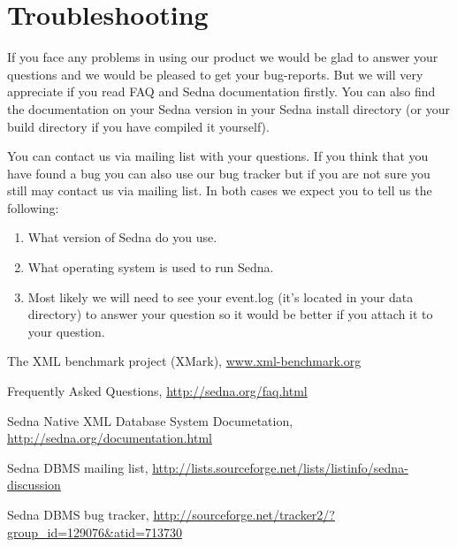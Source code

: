 \documentclass[a4paper,12pt]{article}
\begin{document}
\section{Troubleshooting}
\label{sec:troubleshooting}

If you face any problems in using our product we would be glad to answer your
questions and we would be pleased to get your bug-reports. But we will very
appreciate if you read FAQ\cite{link:FAQ} and Sedna
documentation\cite{link:Documentation} firstly. You can also find the
documentation on your Sedna version in your Sedna install directory (or your
build directory if you have compiled it yourself).

You can contact us via mailing list\cite{link:mailing-list} with your questions.
If you think that you have found a bug you can also use our bug
tracker\cite{link:bug-tracker} but if you are not sure you still may contact us
via mailing list. In both cases we expect you to tell us the following:

\begin{enumerate}
\item What version of Sedna do you use.
\item What operating system is used to run Sedna.
\item Most likely we will need to see your event.log (it's located in your data
directory) to answer your question so it would be better if you attach it to
your question.
\end{enumerate}



\begin{thebibliography}{9}
 The XML benchmark project (XMark), \url{www.xml-benchmark.org}

Frequently Asked Questions,
\url{http://sedna.org/faq.html}

Sedna Native XML Database System Documetation,
\url{http://sedna.org/documentation.html}

Sedna DBMS mailing list,
\url{http://lists.sourceforge.net/lists/listinfo/sedna-discussion}

Sedna DBMS bug tracker,
\url{http://sourceforge.net/tracker2/?group_id=129076&atid=713730}

\end{thebibliography}
\end{document}
